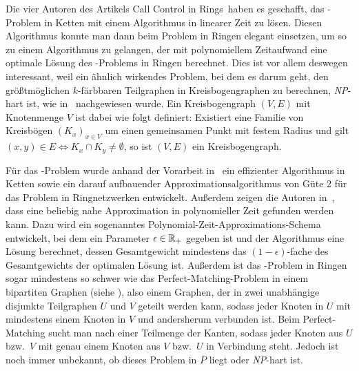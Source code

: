Die vier Autoren des Artikels \glqq Call Control in Rings\grqq\ haben es geschafft, das \CallControl-Problem in Ketten mit
einem Algorithmus in linearer Zeit zu lösen.
Diesen Algorithmus konnte man dann beim Problem in Ringen elegant einsetzen, um so zu einem Algorithmus zu gelangen, der mit polynomiellem Zeitaufwand
eine optimale Lösung des \CallControl-Problems in Ringen berechnet.
Dies ist vor allem deswegen interessant, weil ein ähnlich wirkendes Problem, bei dem es darum geht, den größtmöglichen $k$-färbbaren
Teilgraphen in Kreisbogengraphen zu berechnen, {\em NP}-hart ist, wie in~\cite{circular-arc} nachgewiesen wurde.
Ein Kreisbogengraph $(V,E)$ mit Knotenmenge $V$ ist dabei wie folgt definiert:
Existiert eine Familie von Kreisbögen $(K_x)_{x\in V}$ um einen gemeinsamen Punkt mit festem Radius
und gilt $(x,y)\in E \Leftrightarrow K_x \cap K_y \neq \emptyset$, so ist $(V,E)$ ein Kreisbogengraph.

Für das \WeightedCallControl-Problem wurde anhand der Vorarbeit in~\cite{carlisle} ein effizienter Algorithmus in Ketten sowie ein darauf
aufbauender Approximationsalgorithmus von Güte 2 für das Problem in Ringnetzwerken entwickelt.
Außerdem zeigen die Autoren in~\cite{paper}, dass eine beliebig nahe Approximation in polynomieller Zeit gefunden werden kann.
Dazu wird ein sogenanntes Polynomial-Zeit-Approximations-Schema entwickelt, bei dem ein Parameter $\epsilon \in \mathbb R_+$ gegeben ist
und der Algorithmus eine Lösung berechnet, dessen Gesamtgewicht mindestens das $(1-\epsilon)$-fache des Gesamtgewichts der optimalen Lösung ist.
Außerdem ist das \WeightedCallControl-Problem in Ringen sogar mindestens so schwer wie das Perfect-Matching-Problem in einem bipartiten Graphen (siehe \cite{hochbaum-levin}),
also einem Graphen, der in zwei unabhängige disjunkte Teilgraphen $U$ und $V$ geteilt werden kann, sodass jeder Knoten in $U$ mit mindestens einem Knoten in $V$ und andersherum verbunden ist.
Beim Perfect-Matching sucht man nach einer Teilmenge der Kanten, sodass jeder Knoten aus $U$ bzw.\ $V$ mit genau einem Knoten aus $V$ bzw.\ $U$ in Verbindung steht.
Jedoch ist noch immer unbekannt, ob dieses Problem in $P$ liegt oder {\em NP}-hart ist.
